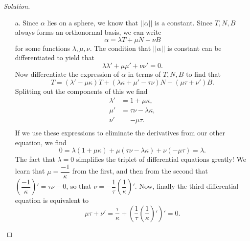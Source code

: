 \documentclass[Shifrin_Solutions_Spring_2018]{subfiles}
\begin{document}
\begin{proof}[Solution] {$\ $} \\
\begin{itemize}
\item[a.] Since $\alpha$ lies on a sphere, we know that $||\alpha||$ is a constant. Since $T, N, B$ always forms an orthonormal basis, we can write
\[
\alpha = \lambda T + \mu N + \nu B
\]
for some functions $\lambda, \mu, \nu$.  The condition that $||\alpha||$ is constant can be differentiated to yield that
\begin{equation*}%
\lambda \lambda' + \mu \mu' + \nu\nu' = 0.
\end{equation*}
Now differentiate the expression of $\alpha$ in terms of $T, N, B$ to find that
\begin{equation*}
T = (\lambda' - \mu \kappa) T + (\lambda \kappa + \mu' -\tau \nu) N + ( \mu \tau+ \nu') B .
\end{equation*}
Splitting out the components of this we find
\begin{align*}%
\lambda' & = 1 + \mu \kappa , \\
\mu ' & = \tau \nu - \lambda \kappa , \\
\nu' & = -\mu \tau .\\
\end{align*}
If we use these expressions to eliminate the derivatives from our other equation, we find
\[
0 = \lambda (1+\mu \kappa) + \mu (\tau \nu - \lambda \kappa) + \nu (-\mu\tau) = \lambda.
\]
The fact that $\lambda = 0$ simplifies the triplet of differential equations greatly! We learn that  $\mu = \dfrac{-1}{\kappa}$ from the first, and then from the second that
$ \left( \dfrac{-1}{\kappa}\right)' = \tau \nu -0$, so that $\nu = -\dfrac{1}{\tau}\left(\dfrac{1}{\kappa}\right)'$. Now, finally the third differential equation is equivalent to
\[
\mu \tau + \nu' = \dfrac{\tau}{\kappa} + \left(\dfrac{1}{\tau} \left(\dfrac{1}{\kappa}\right)' \right)' =0 .
\]


\end{itemize}
\end{proof}
\end{document}
